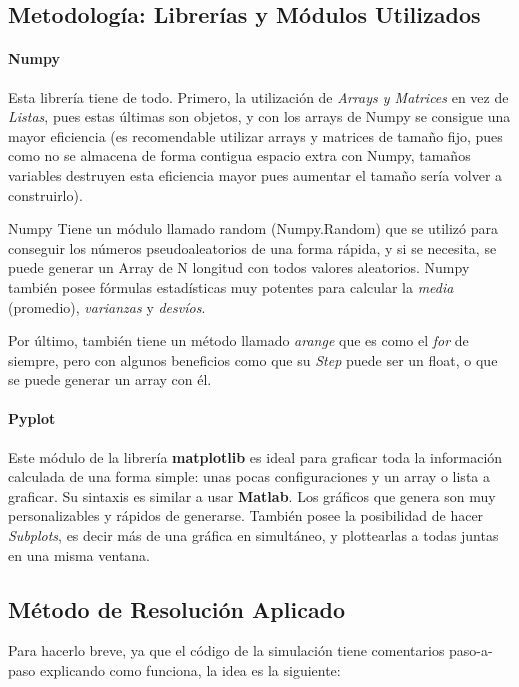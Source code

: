 \documentclass[a4paper]{article}
\begin{document}
\subsection{Metodología: Librerías y Módulos Utilizados}
\label{sec:metodologia}

\paragraph{Numpy}\cite{numpy_doc}
Esta librería tiene de todo. Primero, la utilización de \textit{Arrays y Matrices} en vez de \textit{Listas}, pues estas últimas son objetos, y con los arrays de Numpy se consigue una mayor eficiencia (es recomendable utilizar arrays y matrices de tamaño fijo, pues como no se almacena de forma contigua espacio extra con Numpy, tamaños variables destruyen esta eficiencia mayor pues aumentar el tamaño sería volver a construirlo).

Numpy Tiene un módulo llamado random (Numpy.Random) que se utilizó para conseguir los números pseudoaleatorios de una forma rápida, y si se necesita, se puede generar un Array de N longitud con todos valores aleatorios.
Numpy también posee fórmulas estadísticas muy potentes para calcular la \textit{media} (promedio), \textit{varianzas} y \textit{desvíos}.

Por último, también tiene un método llamado \textit{arange} que es como el \textit{for} de siempre, pero con algunos beneficios como que su \textit{Step} puede ser un float, o que se puede generar un array con él.

\paragraph{Pyplot}\cite{pyplot_doc}
Este módulo de la librería \textbf{matplotlib} es ideal para graficar toda la información calculada de una forma simple: unas pocas configuraciones y un array o lista a graficar. Su sintaxis es similar a usar \textbf{Matlab}. Los gráficos que genera son muy personalizables y rápidos de generarse. También posee la posibilidad de hacer \textit{Subplots}, es decir más de una gráfica en simultáneo, y plottearlas a todas juntas en una misma ventana.

\subsection{Método de Resolución Aplicado}
\label{sec:resolución}

Para hacerlo breve, ya que el código de la simulación tiene comentarios paso-a-paso explicando como funciona, la idea es la siguiente:
\end{document}
